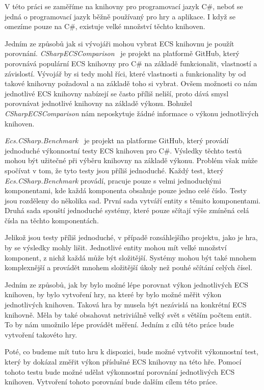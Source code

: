 V této práci se zaměříme na knihovny pro programovací jazyk C\#, neboť se jedná o programovací jazyk běžně používaný pro hry a aplikace. I když se omezíme pouze na C\#, existuje velké množství těchto knihoven.

Jedním ze způsobů jak si vývojáři mohou vybrat ECS knihovnu je použít porovnání. \textit{CSharpECSComparison}~\cite{CSharpECSComparison} je projekt na platformě GitHub, který porovnává populární ECS knihovny pro C\# na základě funkcionalit, vlastností a závislostí. Vývojář by si tedy mohl říci, které vlastnosti a funkcionality by od takové knihovny požadoval a na základě toho si vybrat. Ovšem možnosti co nám jednotlivé ECS knihovny nabízejí se často příliš neliší, proto dává smysl porovnávat jednotlivé knihovny na základě výkonu. Bohužel \textit{CSharpECSComparison} nám neposkytuje žádné informace o výkonu jednotlivých knihoven.

\textit{Ecs.CSharp.Benchmark}~\cite{EcsCsharpBenchmark} je projekt na platforme GitHub, který provádí jednoduché výkonnostní testy ECS knihoven pro C\#. Výsledky těchto testů mohou být užitečné při výběru knihovny na základě výkonu. Problém však může spočívat v tom, že tyto testy jsou příliš jednoduché. Každý test, který \textit{Ecs.CSharp.Benchmark} provádí, pracuje pouze s velmi jednoduchými komponentami, kde každá komponenta obsahuje pouze jedno celé číslo. Testy jsou rozděleny do několika sad. První sada vytváří entity s těmito komponentami. Druhá sada spouští jednoduché systémy, které pouze sčítají výše zmíněná celá čísla na těchto komponentách.

Jelikož jsou testy příliš jednoduché, v případě rozsáhlejšího projektu, jako je hra, by se výsledky mohly lišit. Jednotlivé entity mohou mít velké množství komponent, z nichž každá může být složitější. Systémy mohou být také mnohem komplexnější a provádět mnohem složitější úkoly než pouhé sčítání celých čísel.

Jedním ze způsobů, jak by bylo možné lépe porovnat výkon jednotlivých ECS knihoven, by bylo vytvoření hry, na které by bylo možné měřit výkon jednotlivých knihoven. Taková hra by musela být nezávislá na konkrétní ECS knihovně. Měla by také obsahovat netriviálně velký svět s větším počtem entit. To by nám umožnilo lépe provádět měření. Jedním z cílů této práce bude vytvoření takovéto hry.

Poté, co budeme mít tuto hru k dispozici, bude možné vytvořit výkonnostní test, který by dokázal změřit výkon příslušné ECS knihovny na této hře. Pomocí tohoto testu bude možné udělat výkonnostní porovnání jednotlivých ECS knihoven. Vytvoření tohoto porovnání bude dalším cílem této práce.

